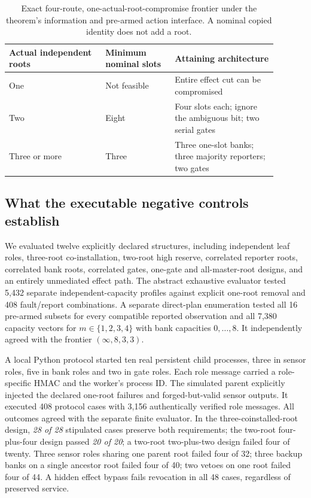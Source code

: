 \documentclass[11pt,a4paper]{article}
\theoremstyle{definition}\newtheorem{definition}{Definition}
\begin{document}
\begin{table}[t]
\centering\small
\caption{Exact four-route, one-actual-root-compromise frontier under the theorem's information and pre-armed action interface. A nominal copied identity does not add a root.}
\label{tab:roots}
\begin{tabular}{@{}p{0.32\linewidth}p{0.23\linewidth}p{0.34\linewidth}@{}}\toprule
Actual independent roots & Minimum nominal slots & Attaining architecture\\\midrule
One & Not feasible & Entire effect cut can be compromised\\
Two & Eight & Four slots each; ignore the ambiguous bit; two serial gates\\
Three or more & Three & Three one-slot banks; three majority reporters; two gates\\\bottomrule
\end{tabular}
\end{table}

\subsection{What the executable negative controls establish}
\label{sec:root-execution}
We evaluated twelve explicitly declared structures, including independent leaf roles, three-root co-installation, two-root high reserve, correlated reporter roots, correlated bank roots, correlated gates, one-gate and all-master-root designs, and an entirely unmediated effect path. The abstract exhaustive evaluator tested 5,432 separate independent-capacity profiles against explicit one-root removal and 408 fault/report combinations. A separate direct-plan enumeration tested all 16 pre-armed subsets for every compatible reported observation and all 7,380 capacity vectors for $m\in\{1,2,3,4\}$ with bank capacities $0,\ldots,8$. It independently agreed with the frontier $(\infty,8,3,3)$.

A local Python protocol started ten real persistent child processes, three in sensor roles, five in bank roles and two in gate roles. Each role message carried a role-specific HMAC and the worker's process ID. The simulated parent explicitly injected the declared one-root failures and forged-but-valid sensor outputs. It executed 408 protocol cases with 3,156 authentically verified role messages. All outcomes agreed with the separate finite evaluator. In the three-coinstalled-root design, \emph{28 of 28} stipulated cases preserve both requirements; the two-root four-plus-four design passed \emph{20 of 20}; a two-root two-plus-two design failed four of twenty. Three sensor roles sharing one parent root failed four of 32; three backup banks on a single ancestor root failed four of 40; two vetoes on one root failed four of 44. A hidden effect bypass fails revocation in all 48 cases, regardless of preserved service.
\end{document}
